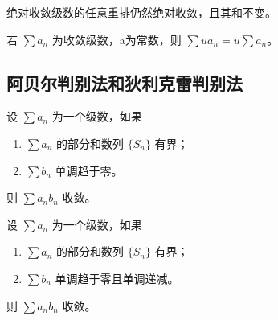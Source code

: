 \begin{theorem}
    绝对收敛级数的任意重排仍然绝对收敛，且其和不变。
\end{theorem}

\begin{theorem}[级数的乘积]
    若 $\sum a_{n}$ 为收敛级数，a为常数，则 $\sum u a_{n} = u \sum a_{n}$。
\end{theorem}


\subsection{阿贝尔判别法和狄利克雷判别法}

\begin{theorem}[阿贝尔判别法]
    设 $\sum a_{n}$ 为一个级数，如果
    \begin{enumerate}
        \item $\sum a_{n}$ 的部分和数列 $\{S_{n}\}$ 有界；
        \item $\sum b_{n}$ 单调趋于零。
    \end{enumerate}
    则 $\sum a_{n} b_{n}$ 收敛。
\end{theorem}

\begin{theorem}[狄利克雷判别法]
    设 $\sum a_{n}$ 为一个级数，如果
    \begin{enumerate}
        \item $\sum a_{n}$ 的部分和数列 $\{S_{n}\}$ 有界；
        \item $\sum b_{n}$ 单调趋于零且单调递减。
    \end{enumerate}
    则 $\sum a_{n} b_{n}$ 收敛。
\end{theorem}
